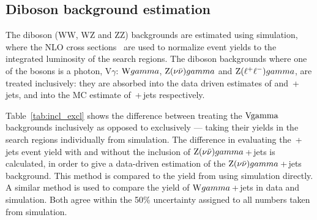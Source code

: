 \subsection{Diboson background estimation}
The diboson (WW, WZ and ZZ) backgrounds are estimated using simulation, where the NLO cross sections~\cite{MCFM:diboson} are used to normalize event yields to the integrated luminosity of the search regions. 
The diboson backgrounds where one of the bosons is a photon, V$\gamma$: $\W\gamma$, $\znunubr \gamma$ and $\zellellbr \gamma$, are treated inclusively: they are absorbed into the data driven estimates of \wpj{} and \znunubr{}\,+\,jets, 
and into the MC estimate of \zellellbr{}\,+\,jets respectively. 

Table~\ref{tab:incl_excl} shows the difference between treating the $\rm{V}\gamma$ backgrounds inclusively as opposed to exclusively --- taking their yields in the search regions individually from simulation.
The difference in evaluating the \znunubr{}\,+\,jets event yield with and without the inclusion of $\znunubr \gamma${}\,+\,jets is calculated, in order to give a data-driven estimation of the $\znunubr \gamma${}\,+\,jets background.
This method is compared to the yield from using simulation directly.
A similar method is used to compare the yield of $\W \gamma${}\,+\,jets in data and simulation.
Both agree within the 50\% uncertainty assigned to all numbers taken from simulation. 

